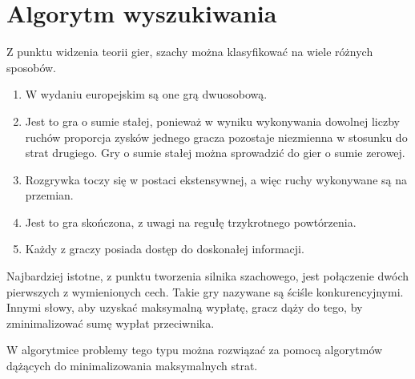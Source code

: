 \section{Algorytm wyszukiwania}
\label {sec:algorytm-wyszukiwania}


Z punktu widzenia teorii gier, szachy można klasyfikować na wiele różnych sposobów.
\begin{enumerate}
    \item W wydaniu europejskim są one grą dwuosobową.
    \item Jest to gra o sumie stałej, ponieważ w wyniku wykonywania dowolnej liczby ruchów proporcja zysków jednego gracza pozostaje niezmienna w stosunku do strat drugiego.
    Gry o sumie stałej można sprowadzić do gier o sumie zerowej.
    \item Rozgrywka toczy się w postaci ekstensywnej, a więc ruchy wykonywane są na przemian.
    \item Jest to gra skończona, z uwagi na regułę trzykrotnego powtórzenia.
    \item Każdy z graczy posiada dostęp do doskonałej informacji.
\end{enumerate}

Najbardziej istotne, z punktu tworzenia silnika szachowego, jest połączenie dwóch pierwszych z wymienionych cech.
Takie gry nazywane są ściśle konkurencyjnymi.
Innymi słowy, aby uzyskać maksymalną wypłatę, gracz dąży do tego, by zminimalizować sumę wypłat przeciwnika. \cite*{wstep-teoria-gier}

W algorytmice problemy tego typu można rozwiązać za pomocą algorytmów dążących do minimalizowania maksymalnych strat.


